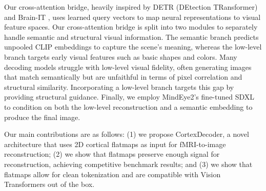 Our cross-attention bridge, heavily inspired by DETR (DEtection TRansformer) \cite{DBLP:journals/corr/abs-2005-12872} and Brain-IT \cite{beliy2025brainitimagereconstructionfmri}, uses learned query vectors to map neural representations to visual feature spaces. Our cross-attention bridge is split into two modules to separately handle semantic and structural visual information. The semantic branch predicts unpooled CLIP \cite{radford2021learningtransferablevisualmodels} embeddings to capture the scene’s meaning, whereas the low-level branch targets early visual features such as basic shapes and colors. Many decoding models struggle with low-level visual fidelity, often generating images that match semantically but are unfaithful in terms of pixel correlation and structural similarity. Incorporating a low-level branch targets this gap by providing structural guidance. Finally, we employ MindEye2’s \cite{scotti2024mindeye2sharedsubjectmodelsenable} fine-tuned SDXL \cite{podell2023sdxlimprovinglatentdiffusion} to condition on both the low-level reconstruction and a semantic embedding to produce the final image.

Our main contributions are as follows: (1) we propose CortexDecoder, a novel architecture that uses 2D cortical flatmaps as input for fMRI-to-image reconstruction; (2) we show that flatmaps preserve enough signal for reconstruction, achieving competitive benchmark results; and (3) we show that flatmaps allow for clean tokenization and are compatible with Vision Transformers out of the box.








